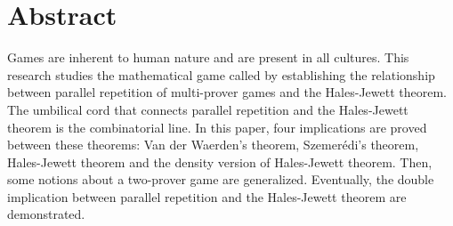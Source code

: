 
\chapter*{Abstract} 

Games are inherent to  human nature and are present in all cultures. This research studies the mathematical game called  by establishing the relationship between parallel repetition of multi-prover games and the Hales-Jewett theorem. The umbilical cord that connects parallel repetition and the Hales-Jewett theorem is the combinatorial line.  In this paper, four implications are proved between these theorems: Van der Waerden's theorem, Szemerédi's theorem, Hales-Jewett theorem and the density version of Hales-Jewett theorem. Then,  some notions about a two-prover game are  generalized. Eventually, the double implication between parallel repetition and the Hales-Jewett theorem are demonstrated.





